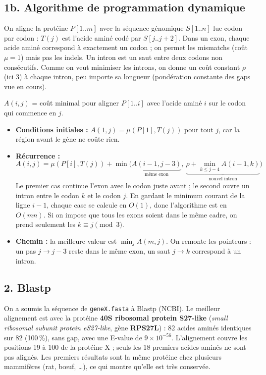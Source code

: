 \documentclass[11pt]{article}
\begin{document}
\subsection*{1b. Algorithme de programmation dynamique}
On aligne la protéine $P[1..m]$ avec la séquence génomique $S[1..n]$ lue codon par codon : $T(j)$ est l'acide aminé
codé par $S[j..j+2]$. Dans un exon, chaque acide aminé correspond à exactement un codon ; on permet les mismatchs
(coût $\mu=1$) mais pas les indels. Un intron est un saut entre deux codons non consécutifs. Comme on veut minimiser
les introns, on donne un coût constant $\rho$ (ici 3) à chaque intron, peu importe sa longueur (pondération
constante des gaps vue en cours).

$A(i,j)$ = coût minimal pour aligner $P[1..i]$ avec l'acide aminé $i$ sur le codon qui commence en $j$.
\begin{itemize}
\item \textbf{Conditions initiales :} $A(1,j)=\mu(P[1],T(j))$ pour tout $j$, car la région avant le gène ne coûte rien.
\item \textbf{Récurrence :}
\[
A(i,j)=\mu(P[i],T(j))+\min\Big(\underbrace{A(i-1,j-3)}_{\text{même exon}},\ \underbrace{\rho+\min_{k\le j-4}A(i-1,k)}_{\text{nouvel intron}}\Big)
\]
Le premier cas continue l'exon avec le codon juste avant ; le second ouvre un intron entre le codon $k$ et le codon $j$.
En gardant le minimum courant de la ligne $i-1$, chaque case se calcule en $O(1)$, donc l'algorithme est en $O(mn)$.
Si on impose que tous les exons soient dans le même cadre, on prend seulement les $k\equiv j \pmod 3$.
\item \textbf{Chemin :} la meilleure valeur est $\min_j A(m,j)$. On remonte les pointeurs : un pas $j\to j-3$ reste dans
le même exon, un saut $j\to k$ correspond à un intron.
\end{itemize}
\subsection*{2. Blastp}
On a soumis la séquence de \texttt{geneX.fasta} à Blastp (NCBI). Le meilleur alignement est avec la protéine
\textbf{40S ribosomal protein S27-like} (\emph{small ribosomal subunit protein eS27-like}, gène \textbf{RPS27L}) :
82 acides aminés identiques sur 82 (100\,\%), sans gap, avec une E-value de $9\times10^{-56}$. L'alignement couvre les
positions 19 à 100 de la protéine X ; seuls les 18 premiers acides aminés ne sont pas alignés. Les premiers résultats
sont la même protéine chez plusieurs mammifères (rat, bœuf, \dots), ce qui montre qu'elle est très conservée.
\end{document}
